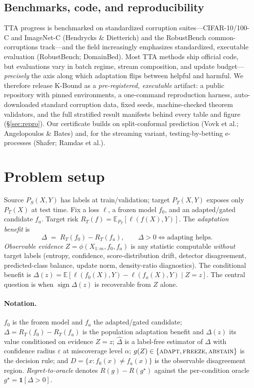 \documentclass[11pt]{article}
\theoremstyle{plain}
\theoremstyle{definition}
\newcommand{\E}{\mathbb{E}}
\newcommand{\sign}{\operatorname{sign}}
\begin{document}
\subsection{Benchmarks, code, and reproducibility}
TTA progress is benchmarked on standardized corruption suites---CIFAR-10/100-C and ImageNet-C
(Hendrycks \& Dietterich) and the RobustBench common-corruptions track---and the field
increasingly emphasizes standardized, executable evaluation (RobustBench; DomainBed). Most TTA
methods ship official code, but evaluations vary in batch regime, stream composition, and update
budget---\emph{precisely} the axis along which adaptation flips between helpful and harmful. We
therefore release K-Bound as a \emph{pre-registered, executable} artifact: a public repository
with pinned environments, a one-command reproduction harness, auto-downloaded standard corruption
data, fixed seeds, machine-checked theorem validators, and the full stratified result manifests
behind every table and figure (\S\ref{sec:repro}). Our certificate builds on split-conformal
prediction (Vovk et al.; Angelopoulos \& Bates) and, for the streaming variant, testing-by-betting
e-processes (Shafer; Ramdas et al.).

\section{Problem setup}\label{sec:setup}
Source $P_S(X,Y)$ has labels at train/validation; target $P_T(X,Y)$ exposes only
$P_T(X)$ at test time. Fix a loss $\ell$, a frozen model $f_0$, and an
adapted/gated candidate $f_a$. Target risk $R_T(f)=\E_{P_T}[\ell(f(X),Y)]$.
The \emph{adaptation benefit} is
\begin{equation}
\Delta \;=\; R_T(f_0)-R_T(f_a),\qquad \Delta>0 \iff \text{adapting helps.}
\end{equation}
\emph{Observable evidence} $Z=\phi(X_{1:m},f_0,f_a)$ is any statistic computable
\emph{without} target labels (entropy, confidence, score-distribution drift,
detector disagreement, predicted-class balance, update norm, density-ratio
diagnostics). The conditional benefit is $\Delta(z)=\E[\ell(f_0(X),Y)-\ell(f_a(X),Y)\mid Z=z]$.
The central question is when $\sign\Delta(z)$ is recoverable from $Z$ alone.

\paragraph{Notation.} $f_0$ is the frozen model and $f_a$ the adapted/gated candidate;
$\Delta=R_T(f_0)-R_T(f_a)$ is the population adaptation benefit and $\Delta(z)$ its value
conditioned on evidence $Z{=}z$; $\widehat\Delta$ is a label-free estimator of $\Delta$ with
confidence radius $\varepsilon$ at miscoverage level $\alpha$; $g(Z)\in\{\textsc{adapt},
\textsc{freeze},\textsc{abstain}\}$ is the decision rule; and $D=\{x:f_0(x)\neq f_a(x)\}$ is the
observable disagreement region. \emph{Regret-to-oracle} denotes $R(g)-R(g^\star)$ against the
per-condition oracle $g^\star=\mathbf1[\Delta>0]$.
\end{document}

